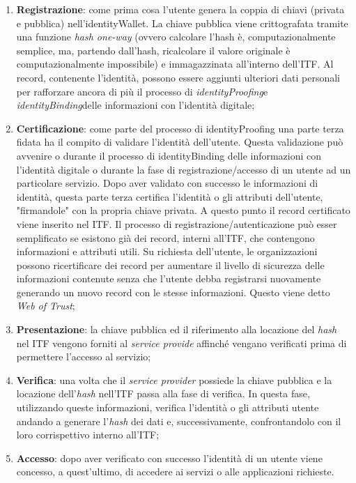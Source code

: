\begin{enumerate}
	\item \textbf{Registrazione}: come prima cosa l'utente genera la coppia di chiavi (privata e pubblica) nell'\gls{identityWallet}. La chiave pubblica viene crittografata tramite una funzione \textit{hash one-way} (ovvero calcolare l'hash è, computazionalmente semplice, ma, partendo dall'hash, ricalcolare il valore originale è computazionalmente impossibile) e immagazzinata all'interno dell'\gls{ITF}. Al record, contenente l'identità, possono essere aggiunti ulteriori dati personali per rafforzare ancora di più il processo di \emph{\gls{identityProofing}}\glsfirstoccur e \emph{\gls{identityBinding}}\glsfirstoccur delle informazioni con l'identità digitale;
	 
	\item \textbf{Certificazione}: come parte del processo di \gls{identityProofing} una parte terza fidata ha il compito di validare l'identità dell'utente. Questa validazione può avvenire o durante il processo di \gls{identityBinding} delle informazioni con l'identità digitale o durante la fase di registrazione/accesso di un utente ad un particolare servizio. Dopo aver validato con successo le informazioni di identità, questa parte terza certifica l'identità o gli attributi dell'utente, "firmandole" con la propria chiave privata. A questo punto il record certificato viene inserito nel \gls{ITF}.
	Il processo di registrazione/autenticazione può esser semplificato se esistono già dei record, interni all'\gls{ITF}, che contengono informazioni e attributi utili. 
	Su richiesta dell'utente, le organizzazioni possono ricertificare dei record per aumentare il livello di sicurezza delle informazioni contenute senza che l'utente debba registrarsi nuovamente generando un nuovo record con le stesse informazioni. Questo viene detto \textit{Web of Trust};
	 
	\item \textbf{Presentazione}: la chiave pubblica ed il riferimento alla locazione del \textit{hash} nel \gls{ITF} vengono forniti al \textit{service provide} affinché vengano verificati prima di permettere l'accesso al servizio;
	
	\item \textbf{Verifica}: una volta che il \textit{service provider} possiede la chiave pubblica e la locazione dell'\textit{hash} nell'\gls{ITF} passa alla fase di verifica.
	In questa fase, utilizzando queste informazioni, verifica l'identità o gli attributi utente andando a generare l'\textit{hash} dei dati e, successivamente, confrontandolo con il loro corrispettivo interno all'\gls{ITF};
	 
	\item \textbf{Accesso}: dopo aver verificato con successo l'identità di un utente viene concesso, a quest'ultimo, di accedere ai servizi o alle applicazioni richieste.
\end{enumerate}
